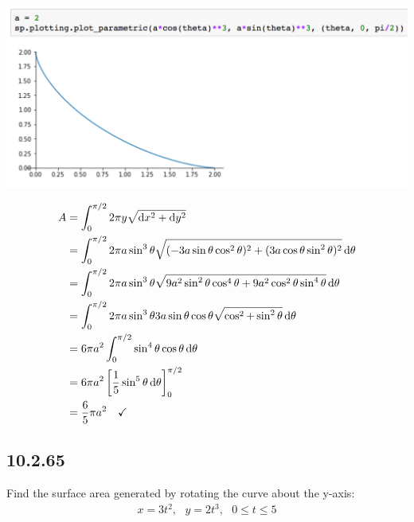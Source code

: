 \includegraphics[width=500pt]{img/10-2-63.png}

\begin{mdframed}
  \begin{align*}
    A &= \int_0^{\pi/2} 2\pi y \sqrt{\dx^2 + \dy^2}\\
      &= \int_0^{\pi/2} 2\pi a\sin^3\theta \sqrt{(-3a\sin\theta\cos^2\theta)^2 +
                                                (3a\cos\theta\sin^2\theta)^2} \dtheta\\
      &= \int_0^{\pi/2} 2\pi a\sin^3\theta \sqrt{9a^2\sin^2\theta\cos^4\theta +
                                                9a^2\cos^2\theta\sin^4\theta} \dtheta\\
      &= \int_0^{\pi/2} 2\pi a\sin^3\theta 3a\sin\theta\cos\theta \sqrt{\cos^2 + \sin^2\theta} \dtheta\\
      &= 6\pi a^2\int_0^{\pi/2} \sin^4\theta \cos\theta \dtheta\\
      &= 6\pi a^2 \left[\frac{1}{5}\sin^5\theta \dtheta \right]_0^{\pi/2}\\
      &= \frac{6}{5}\pi a^2  ~~~ \checkmark
  \end{align*}
\end{mdframed}

\newpage
\subsection*{10.2.65}
Find the surface area generated by rotating the curve about the y-axis:
\begin{align*}
  x = 3t^2, ~~~ y = 2t^3, ~~~ 0 \leq t \leq 5
\end{align*}

